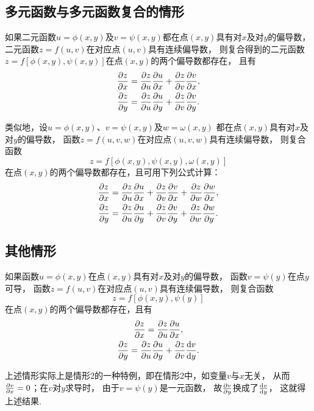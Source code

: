 \subsection{多元函数与多元函数复合的情形}
\begin{theorem}
如果二元函数\(u=\phi(x,y)\)及\(v=\psi(x,y)\)都在点\((x,y)\)具有对\(x\)及对\(y\)的偏导数，
二元函数\(z=f(u,v)\)在对应点\((u,v)\)具有连续偏导数，
则复合得到的二元函数\(z=f[\phi(x,y),\psi(x,y)]\)在点\((x,y)\)的两个偏导数都存在，
且有\begin{gather*}
	\pdv{z}{x} = \pdv{z}{u}\pdv{u}{x} + \pdv{z}{v}\pdv{v}{x}, \\
	\pdv{z}{y} = \pdv{z}{u}\pdv{u}{y} + \pdv{z}{v}\pdv{v}{y}.
\end{gather*}
\end{theorem}
类似地，设\(u=\phi(x,y)\)、\(v=\psi(x,y)\)及\(w=\omega(x,y)\)
都在点\((x,y)\)具有对\(x\)及对\(y\)的偏导数，
函数\(z=f(u,v,w)\)在对应点\((u,v,w)\)具有连续偏导数，
则复合函数\begin{equation*}
	z = f[\phi(x,y),\psi(x,y),\omega(x,y)]
\end{equation*}
在点\((x,y)\)的两个偏导数都存在，且可用下列公式计算：\begin{gather*}
	\pdv{z}{x} = \pdv{z}{u}\pdv{u}{x} + \pdv{z}{v}\pdv{v}{x} + \pdv{z}{w}\pdv{w}{x}, \\
	\pdv{z}{y} = \pdv{z}{u}\pdv{u}{y} + \pdv{z}{v}\pdv{v}{y} + \pdv{z}{w}\pdv{w}{y}.
\end{gather*}

\subsection{其他情形}
\begin{theorem}
如果函数\(u=\phi(x,y)\)在点\((x,y)\)具有对\(x\)及对\(y\)的偏导数，
函数\(v=\psi(y)\)在点\(y\)可导，
函数\(z=f(u,v)\)在对应点\((u,v)\)具有连续偏导数，
则复合函数\begin{equation*}
	z = f[\phi(x,y),\psi(y)]
\end{equation*}
在点\((x,y)\)的两个偏导数都存在，且有\begin{gather*}
	\pdv{z}{x} = \pdv{z}{u} \pdv{u}{x}, \\
	\pdv{z}{y} = \pdv{z}{u} \pdv{u}{y} + \pdv{z}{v} \dv{v}{y}.
\end{gather*}
\end{theorem}
上述情形实际上是情形2的一种特例，即在情形2中，如变量\(v\)与\(x\)无关，
从而\(\pdv{v}{x}=0\)；在\(v\)对\(y\)求导时，
由于\(v=\psi(y)\)是一元函数，
故\(\pdv{v}{y}\)换成了\(\dv{v}{y}\)，
这就得上述结果.

